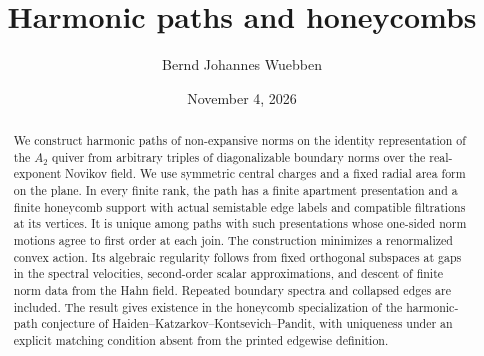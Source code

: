 \documentclass[11pt]{amsart}
\title{Harmonic paths and honeycombs}
\author{Bernd Johannes Wuebben}
\date{November 4, 2026}
\theoremstyle{definition}
\theoremstyle{remark}
\begin{document}
\begin{abstract}
We construct harmonic paths of non-expansive norms on the identity
representation of the $A_2$ quiver from arbitrary triples of diagonalizable
boundary norms over the real-exponent Novikov field. We use symmetric
central charges and a fixed radial area form on the plane. In every finite
rank, the path has a finite apartment presentation and a finite honeycomb
support with actual semistable edge labels and compatible filtrations at
its vertices. It is unique among paths with such presentations whose
one-sided norm motions agree to first order at each join. The construction
minimizes a renormalized convex action. Its algebraic regularity follows
from fixed orthogonal subspaces at gaps in the spectral velocities,
second-order scalar approximations, and descent of finite norm data from
the Hahn field. Repeated boundary spectra and collapsed edges are included.
The result gives existence in the honeycomb specialization of the harmonic-path
conjecture of Haiden--Katzarkov--Kontsevich--Pandit, with uniqueness under an
explicit matching condition absent from the printed edgewise definition.
\end{abstract}
\maketitle












\end{document}
